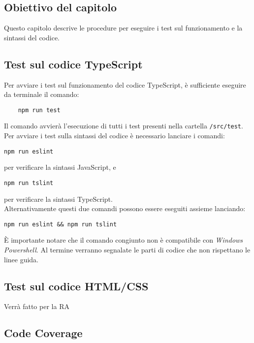 \subsection{Obiettivo del capitolo}
Questo capitolo descrive le procedure per eseguire i test sul funzionamento e la sintassi del codice.
\subsection{Test sul codice TypeScript}
Per avviare i test sul funzionamento del codice TypeScript, è sufficiente eseguire da terminale il comando:
\begin{verbatim}
	npm run test
\end{verbatim}
Il comando avvierà l'esecuzione di tutti i test presenti nella cartella \texttt{/src/test}.
Per avviare i test sulla sintassi del codice è necessario lanciare i comandi:
\begin{verbatim}
npm run eslint
\end{verbatim}
per verificare la sintassi JavaScript, e
\begin{verbatim}
npm run tslint
\end{verbatim}
per verificare la sintassi TypeScript.\\
Alternativamente questi due comandi possono essere eseguiti assieme lanciando:
\begin{verbatim}
npm run eslint && npm run tslint
\end{verbatim}
È importante notare che il comando congiunto non è compatibile con \emph{Windows Powershell}.
Al termine verranno segnalate le parti di codice che non rispettano le linee guida.

\subsection{Test sul codice HTML/CSS}
Verrà fatto per la RA
\subsection{Code Coverage}
